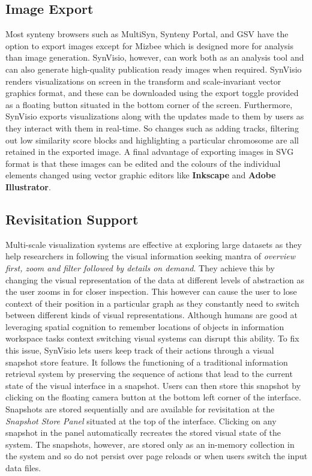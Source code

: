 \subsection{Image Export}
Most synteny browsers such as MultiSyn, Synteny Portal, and GSV\cite{baek2016multisyn,lee2016syntenyportal,revanna2011gsv} have the option to export images except for Mizbee\cite{Meyer2009} which is designed more for analysis than image generation.
SynVisio, however, can work both as an analysis tool and can also generate high-quality publication ready images when required. SynVisio renders visualizations on screen in the transform and scale-invariant vector graphics format, and these can be downloaded using the export toggle provided as a floating button situated in the bottom corner of the screen. Furthermore, SynVisio exports visualizations along with the updates made to them by users as they interact with them in real-time. So changes such as adding tracks, filtering out low similarity score blocks and highlighting a particular chromosome are all retained in the exported image. A final advantage of exporting images in SVG format is that these images can be edited and the colours of the individual elements changed using vector graphic editors like \textbf{Inkscape} and \textbf{Adobe Illustrator}.

\subsection{Revisitation Support}
Multi-scale visualization systems are effective at exploring large datasets as they help researchers in following the visual information seeking mantra of \textit{overview first, zoom and filter followed by details on demand}\cite{Shneiderman96theeyes}. They achieve this by changing the visual representation of the data at different levels of abstraction as the user zooms in for closer inspection\cite{Stolte}. This however can cause the user to lose context of their position in a particular graph as they constantly need to switch between different kinds of visual representations.
Although humans are good at leveraging spatial cognition to remember locations of objects in information workspace tasks\cite{datamountain} context switching visual systems can disrupt this ability. To fix this issue, SynVisio lets users keep track of their actions through a visual snapshot store feature. It follows the functioning of a traditional information retrieval system by preserving the sequence of actions that lead to the current state of the visual interface in a snapshot. Users can then store this snapshot by clicking on the floating camera button at the bottom left corner of the interface. Snapshots are stored sequentially and are available for revisitation at the \textit{Snapshot Store Panel} situated at the top of the interface. Clicking on any snapshot in the panel automatically recreates the stored visual state of the system. The snapshots, however, are stored only as an in-memory collection in the system and so do not persist over page reloads or when users switch the input data files.


